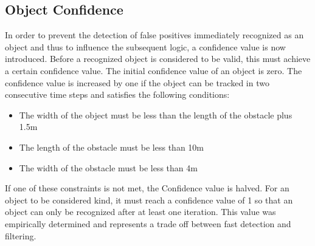 \documentclass[11pt,oneside,openright]{mpreport}
\begin{document}
\subsection{Object Confidence}

In order to prevent the detection of false positives immediately recognized as an object and thus to influence the subsequent logic, a confidence value is now introduced. 
Before a recognized object is considered to be valid, this must achieve a certain confidence value. The initial confidence value of an object is zero. 
The confidence value is increased by one if the object can be tracked in two consecutive time steps and satisfies the following conditions:

\begin{itemize}
\item The width of the object must be less than the length of the obstacle plus 1.5m
\item The length of the obstacle must be less than 10m
\item The width of the obstacle must be less than 4m
\end{itemize}
If one of these constraints is not met, the Confidence value is halved. For an object to be considered kind, it must reach a confidence value of 1 so that an object can only be 
recognized after at least one iteration. This value was empirically determined and represents a trade off between fast detection and filtering.
\end{document}
